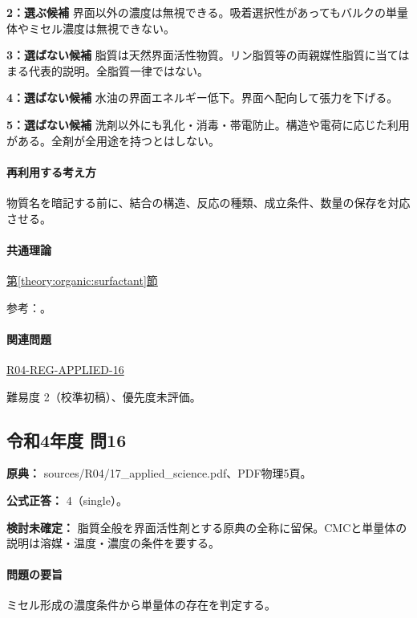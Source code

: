 \noindent\textbf{2：選ぶ候補} 界面以外の濃度は無視できる。吸着選択性があってもバルクの単量体やミセル濃度は無視できない。\par

\noindent\textbf{3：選ばない候補} 脂質は天然界面活性物質。リン脂質等の両親媒性脂質に当てはまる代表的説明。全脂質一律ではない。\par

\noindent\textbf{4：選ばない候補} 水油の界面エネルギー低下。界面へ配向して張力を下げる。\par

\noindent\textbf{5：選ばない候補} 洗剤以外にも乳化・消毒・帯電防止。構造や電荷に応じた利用がある。全剤が全用途を持つとはしない。\par

\paragraph{再利用する考え方} 物質名を暗記する前に、結合の構造、反応の種類、成立条件、数量の保存を対応させる。

\paragraph{共通理論} \hyperref[theory:organic:surfactant]{第\ref*{theory:organic:surfactant}節}

\par 参考：\cite{organic_cmc}。

\paragraph{関連問題} \hyperref[q:r04-reg-applied-16]{R04-REG-APPLIED-16}

\par 難易度 2（校準初稿）、優先度未評価。

\subsection{令和4年度 問16}
\label{q:r04-reg-applied-16}

\noindent\textbf{原典：} sources/R04/17\_applied\_science.pdf、PDF物理5頁。

\textbf{公式正答：} 4（single）。

\par\textbf{検討未確定：} 脂質全般を界面活性剤とする原典の全称に留保。CMCと単量体の説明は溶媒・温度・濃度の条件を要する。

\paragraph{問題の要旨} ミセル形成の濃度条件から単量体の存在を判定する。

